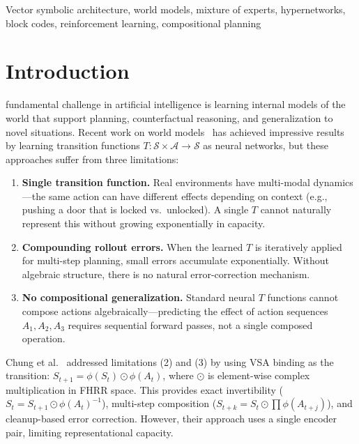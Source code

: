 \documentclass[journal]{IEEEtai}
\begin{document}
\begin{IEEEkeywords}
Vector symbolic architecture, world models, mixture of experts, hypernetworks, block codes, reinforcement learning, compositional planning
\end{IEEEkeywords}

\section{Introduction}

 fundamental challenge in artificial intelligence is learning internal models of the world that support planning, counterfactual reasoning, and generalization to novel situations. Recent work on world models~\cite{ha2018world, hafner2020mastering, hansen2023tdmpc2} has achieved impressive results by learning transition functions $T: \mathcal{S} \times \mathcal{A} \rightarrow \mathcal{S}$ as neural networks, but these approaches suffer from three limitations:

\begin{enumerate}
\item \textbf{Single transition function.} Real environments have multi-modal dynamics---the same action can have different effects depending on context (e.g., pushing a door that is locked vs.\ unlocked). A single $T$ cannot naturally represent this without growing exponentially in capacity.

\item \textbf{Compounding rollout errors.} When the learned $T$ is iteratively applied for multi-step planning, small errors accumulate exponentially. Without algebraic structure, there is no natural error-correction mechanism.

\item \textbf{No compositional generalization.} Standard neural $T$ functions cannot compose actions algebraically---predicting the effect of action sequences $A_1, A_2, A_3$ requires sequential forward passes, not a single composed operation.
\end{enumerate}

Chung et al.~\cite{chung2025geometric} addressed limitations (2) and (3) by using VSA binding as the transition: $S_{t+1} = \phi(S_t) \odot \phi(A_t)$, where $\odot$ is element-wise complex multiplication in FHRR space. This provides exact invertibility ($S_t = S_{t+1} \odot \phi(A_t)^{-1}$), multi-step composition ($S_{t+k} = S_t \odot \prod \phi(A_{t+j})$), and cleanup-based error correction. However, their approach uses a single encoder pair, limiting representational capacity.
\end{document}
